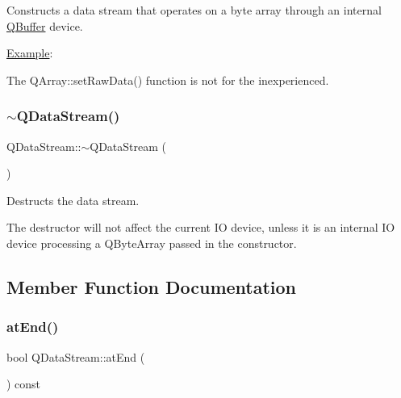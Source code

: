 Constructs a data stream that operates on a byte array through an internal \mbox{\hyperlink{class_q_buffer}{Q\+Buffer}} device.

\mbox{\hyperlink{struct_example}{Example}}\+: 
\begin{DoxyCode}{0}
\end{DoxyCode}


The Q\+Array\+::set\+Raw\+Data() function is not for the inexperienced. \mbox{\label{class_q_data_stream_a69b54286e9842e39edad381c0e9e6cd6}} 
\subsubsection{\texorpdfstring{$\sim$QDataStream()}{~QDataStream()}}
{\footnotesize\ttfamily Q\+Data\+Stream\+::$\sim$\+Q\+Data\+Stream (\begin{DoxyParamCaption}{ }\end{DoxyParamCaption})\hspace{0.3cm}{\ttfamily [virtual]}}

Destructs the data stream.

The destructor will not affect the current IO device, unless it is an internal IO device processing a Q\+Byte\+Array passed in the constructor. 

\subsection{Member Function Documentation}
\mbox{\label{class_q_data_stream_aed16d85107f554048686a6d8d41a4142}} 
\subsubsection{\texorpdfstring{atEnd()}{atEnd()}}
{\footnotesize\ttfamily bool Q\+Data\+Stream\+::at\+End (\begin{DoxyParamCaption}{ }\end{DoxyParamCaption}) const\hspace{0.3cm}{\ttfamily [inline]}}


